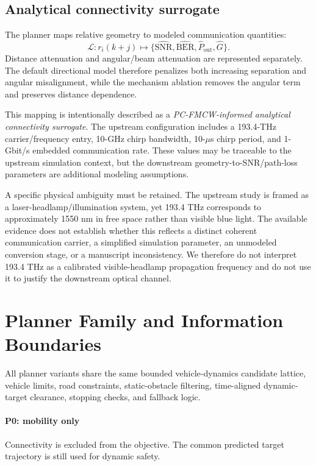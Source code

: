 \documentclass[journal]{IEEEtran}
\begin{document}
\subsection{Analytical connectivity surrogate}
The planner maps relative geometry to modeled communication quantities:
\begin{equation}
\mathcal{L}:r_i(k+j)\mapsto
\{\widehat{\mathrm{SNR}},\widehat{\mathrm{BER}},
\widehat P_{\mathrm{out}},\widehat G\}.
\end{equation}
Distance attenuation and angular/beam attenuation are represented separately. The default directional model therefore penalizes both increasing separation and angular misalignment, while the mechanism ablation removes the angular term and preserves distance dependence.

This mapping is intentionally described as a \emph{PC-FMCW-informed analytical connectivity surrogate}. The upstream configuration includes a 193.4-THz carrier/frequency entry, 10-GHz chirp bandwidth, 10-$\mu$s chirp period, and 1-Gbit/s embedded communication rate. These values may be traceable to the upstream simulation context, but the downstream geometry-to-SNR/path-loss parameters are additional modeling assumptions.

A specific physical ambiguity must be retained. The upstream study is framed as a laser-headlamp/illumination system, yet 193.4 THz corresponds to approximately 1550 nm in free space rather than visible blue light. The available evidence does not establish whether this reflects a distinct coherent communication carrier, a simplified simulation parameter, an unmodeled conversion stage, or a manuscript inconsistency. We therefore do not interpret 193.4 THz as a calibrated visible-headlamp propagation frequency and do not use it to justify the downstream optical channel.

\section{Planner Family and Information Boundaries}
All planner variants share the same bounded vehicle-dynamics candidate lattice, vehicle limits, road constraints, static-obstacle filtering, time-aligned dynamic-target clearance, stopping checks, and fallback logic.

\paragraph{P0: mobility only}
Connectivity is excluded from the objective. The common predicted target trajectory is still used for dynamic safety.
\end{document}
